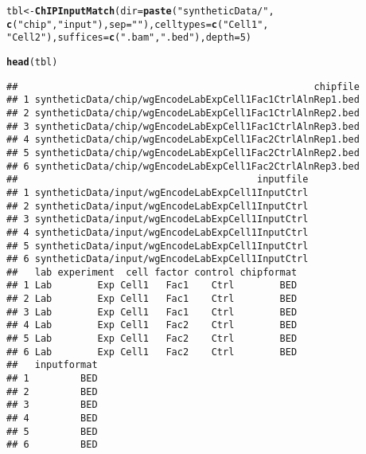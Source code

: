 \documentclass[a4paper,10pt]{article}\usepackage[]{graphicx}\usepackage[]{color}
\makeatletter
\newcommand{\hlnum}[1]{\textcolor[rgb]{0.686,0.059,0.569}{#1}}%
\newcommand{\hlstr}[1]{\textcolor[rgb]{0.192,0.494,0.8}{#1}}%
\newcommand{\hlstd}[1]{\textcolor[rgb]{0.345,0.345,0.345}{#1}}%
\newcommand{\hlkwb}[1]{\textcolor[rgb]{0.69,0.353,0.396}{#1}}%
\newcommand{\hlkwc}[1]{\textcolor[rgb]{0.333,0.667,0.333}{#1}}%
\newcommand{\hlkwd}[1]{\textcolor[rgb]{0.737,0.353,0.396}{\textbf{#1}}}%
\newenvironment{kframe}{%
 \def\at@end@of@kframe{}%
 \ifinner\ifhmode%
  \def\at@end@of@kframe{\end{minipage}}%
  \begin{minipage}{\columnwidth}%
 \fi\fi%
 \def\FrameCommand##1{\hskip\@totalleftmargin \hskip-\fboxsep
 \colorbox{shadecolor}{##1}\hskip-\fboxsep
     \hskip-\linewidth \hskip-\@totalleftmargin \hskip\columnwidth}%
 \MakeFramed {\advance\hsize-\width
   \@totalleftmargin\z@ \linewidth\hsize
   \@setminipage}}%
 {\par\unskip\endMakeFramed%
 \at@end@of@kframe}
\newenvironment{knitrout}{}{} %
\makeatother
\begin{document}
\begin{knitrout}
\color{fgcolor}\begin{kframe}
\begin{alltt}
\hlstd{tbl} \hlkwb{<-} \hlkwd{ChIPInputMatch}\hlstd{(}\hlkwc{dir} \hlstd{=} \hlkwd{paste}\hlstd{(}\hlstr{"syntheticData/"}\hlstd{,}
    \hlkwd{c}\hlstd{(}\hlstr{"chip"}\hlstd{,} \hlstr{"input"}\hlstd{),} \hlkwc{sep} \hlstd{=} \hlstr{""}\hlstd{),} \hlkwc{celltypes} \hlstd{=} \hlkwd{c}\hlstd{(}\hlstr{"Cell1"}\hlstd{,}
    \hlstr{"Cell2"}\hlstd{),} \hlkwc{suffices} \hlstd{=} \hlkwd{c}\hlstd{(}\hlstr{".bam"}\hlstd{,} \hlstr{".bed"}\hlstd{),} \hlkwc{depth} \hlstd{=} \hlnum{5}\hlstd{)}
\end{alltt}


{\ttfamily\noindent\itshape\color{messagecolor}{\#\# Warning:Lab.Exp.Cell1.Ctrlhas multiple matching input files\\\#\# Warning:Lab.Exp.Cell2.Ctrlhas multiple matching input files}}\begin{alltt}
\hlkwd{head}\hlstd{(tbl)}
\end{alltt}
\begin{verbatim}
##                                                    chipfile
## 1 syntheticData/chip/wgEncodeLabExpCell1Fac1CtrlAlnRep1.bed
## 2 syntheticData/chip/wgEncodeLabExpCell1Fac1CtrlAlnRep2.bed
## 3 syntheticData/chip/wgEncodeLabExpCell1Fac1CtrlAlnRep3.bed
## 4 syntheticData/chip/wgEncodeLabExpCell1Fac2CtrlAlnRep1.bed
## 5 syntheticData/chip/wgEncodeLabExpCell1Fac2CtrlAlnRep2.bed
## 6 syntheticData/chip/wgEncodeLabExpCell1Fac2CtrlAlnRep3.bed
##                                          inputfile
## 1 syntheticData/input/wgEncodeLabExpCell1InputCtrl
## 2 syntheticData/input/wgEncodeLabExpCell1InputCtrl
## 3 syntheticData/input/wgEncodeLabExpCell1InputCtrl
## 4 syntheticData/input/wgEncodeLabExpCell1InputCtrl
## 5 syntheticData/input/wgEncodeLabExpCell1InputCtrl
## 6 syntheticData/input/wgEncodeLabExpCell1InputCtrl
##   lab experiment  cell factor control chipformat
## 1 Lab        Exp Cell1   Fac1    Ctrl        BED
## 2 Lab        Exp Cell1   Fac1    Ctrl        BED
## 3 Lab        Exp Cell1   Fac1    Ctrl        BED
## 4 Lab        Exp Cell1   Fac2    Ctrl        BED
## 5 Lab        Exp Cell1   Fac2    Ctrl        BED
## 6 Lab        Exp Cell1   Fac2    Ctrl        BED
##   inputformat
## 1         BED
## 2         BED
## 3         BED
## 4         BED
## 5         BED
## 6         BED
\end{verbatim}
\end{kframe}
\end{knitrout}
\end{document}
